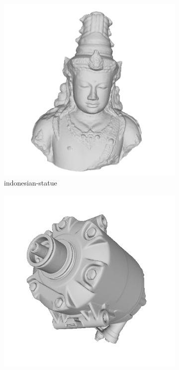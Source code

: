 \begin{figure}[!h]
	\centering
	\begin{subfigure}[b]{0.23\linewidth}
		\includegraphics[width=\linewidth]{./Figures/train-dataset/24.indonesian-statue.png}
		\caption{indonesian-statue}
	\end{subfigure}
	\begin{subfigure}[b]{0.23\linewidth}
		\includegraphics[width=\linewidth]{./Figures/train-dataset/25.industrial-compressor.png}

\end{subfigure}
\end{figure}

